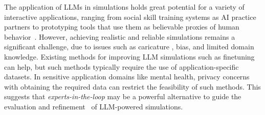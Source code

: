 \documentclass[11pt]{article}
\begin{document}
\fi


The application of LLMs in simulations holds great potential for a variety of interactive applications, ranging from social skill training systems as AI practice partners \cite{yang2024social} to prototyping tools that use them as believable proxies of human behavior~\cite{park2022social}. However, achieving realistic and reliable simulations remains a significant challenge, due to issues such as caricature \cite{cheng-etal-2023-compost}, bias, and limited domain knowledge. 
Existing methods for improving LLM simulations such as finetuning~\cite{demasi-etal-2020-multi} can help, but such methods typically require the use of application-specific datasets. In sensitive application domains like mental health, privacy concerns with obtaining the required data can restrict the feasibility of such methods. This suggests that \textit{experts-in-the-loop} may be a powerful alternative to guide the evaluation and refinement~\cite{chen2023llmempowered} of LLM-powered simulations. 
\end{document}
